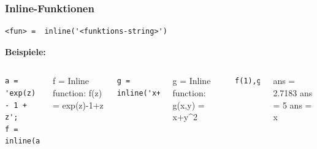 \documentclass[hyperref={xetex}]{beamer}
\begin{document}
%
%
\begin{frame}[fragile]\frametitle{Inline-Funktionen}
\begin{lstlisting}
<fun> =  inline('<funktions-string>')
\end{lstlisting}

\textbf{Beispiele:} \\
\begin{columns}[t]
\begin{lstlisting}
a = 'exp(z) - 1 + z'; 
f = inline(a)
\end{lstlisting}
\begin{matlab}
f =
     Inline function:
     f(z) = exp(z)-1+z
\end{matlab}
\begin{lstlisting}
g = inline('x+y^2','x','y')
\end{lstlisting}
\begin{matlab}
g =
     Inline function:
     g(x,y) = x+y^2
\end{matlab}
\begin{lstlisting}
f(1),g(1,2),a(2)
\end{lstlisting}
\begin{matlab}
ans =
    2.7183
ans =
     5
ans =
     x
\end{matlab}
\end{columns}
\end{frame}
\end{document}
